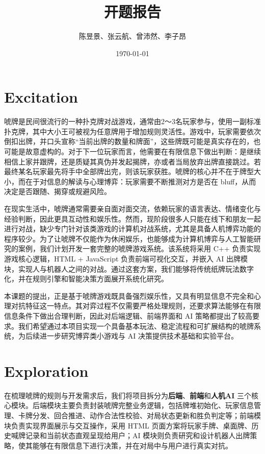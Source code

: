\documentclass{article}
\title{开题报告}
\author{陈昱景、张云航、曾沛然、李子昂}
\date{\today}
\numberwithin{equation}{section}
\begin{document}
\maketitle

\section{Excitation}

唬牌是民间很流行的一种扑克牌对战游戏，通常由2～3名玩家参与，使用一副标准扑克牌，其中大小王可被视为任意牌用于增加规则灵活性。游戏中，玩家需要依次倒扣出牌，并口头宣称“当前出牌的数量和牌面”，这些牌既可能是真实存在的，也可能是故意虚构的。对于下一位玩家而言，他需要在有限信息下做出判断：是继续相信上家并跟牌，还是质疑其真伪并发起揭牌，亦或者当局放弃出牌直接跳过。若最终某名玩家最先将手中全部牌出完，则该玩家获胜。唬牌的核心并不在于牌型大小，而在于对信息的解读与心理博弈：玩家需要不断推测对方是否在 bluff，从而决定是否跟随、揭穿或规避风险。

在现实生活中，唬牌通常需要亲自面对面交流，依赖玩家的语言表达、情绪变化与经验判断，因此更具互动性和娱乐性。然而，现阶段很多人只能在线下和朋友一起进行对战，缺少专门针对该类游戏的计算机对战系统，尤其是具备人机博弈功能的程序较少。为了让唬牌不仅能作为休闲娱乐，也能够成为计算机博弈与人工智能研究的案例，我们计划开发一套完整的唬牌游戏系统。该系统将采用 C++ 负责实现游戏核心逻辑，HTML + JavaScript 负责前端可视化交互，并嵌入 AI 出牌模块，实现人与机器人之间的对战。通过这套方案，我们能够将传统纸牌玩法数字化，并在规则引擎和智能决策方面展开系统化研究。

本课题的提出，正是基于唬牌游戏既具备强烈娱乐性，又具有明显信息不完全和心理对抗特征这一特点。其对弈过程不仅需要严格处理规则，还要求算法能够在有限信息条件下做出合理判断，因此对后端逻辑、前端界面和 AI 策略都提出了较高要求。我们希望通过本项目实现一个具备基本玩法、稳定流程和可扩展结构的唬牌系统，为后续进一步研究博弈类小游戏与 AI 决策提供技术基础和实验平台。

\section{Exploration}

在梳理唬牌的规则与开发需求后，我们将项目拆分为\textbf{后端}、\textbf{前端}和\textbf{人机AI} 三个核心模块。后端模块主要负责封装唬牌完整业务逻辑，包括牌堆初始化、玩家信息管理、卡牌分发、回合推进、动作合法性校验、对局状态更新和胜负判定等；前端模块负责实现界面展示与交互操作，采用 HTML 页面方案将玩家手牌、桌面牌、历史喊牌记录和当前状态直观呈现给用户；AI 模块则负责研究和设计机器人出牌策略，使其能够在有限信息下进行决策，并在对局中与用户进行真实对抗。
\end{document}
